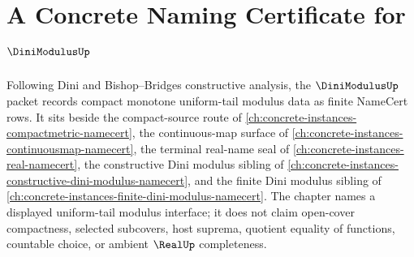 \chapter{A Concrete Naming Certificate for $\DiniModulusUp$}
\label{ch:concrete-instances-dini-modulus-namecert}

Following Dini and Bishop--Bridges constructive analysis, the $\DiniModulusUp$ packet records compact monotone uniform-tail modulus data as finite NameCert rows. It sits beside the compact-source route of \autoref{ch:concrete-instances-compactmetric-namecert}, the continuous-map surface of \autoref{ch:concrete-instances-continuousmap-namecert}, the terminal real-name seal of \autoref{ch:concrete-instances-real-namecert}, the constructive Dini modulus sibling of \autoref{ch:concrete-instances-constructive-dini-modulus-namecert}, and the finite Dini modulus sibling of \autoref{ch:concrete-instances-finite-dini-modulus-namecert}. The chapter names a displayed uniform-tail modulus interface; it does not claim open-cover compactness, selected subcovers, host suprema, quotient equality of functions, countable choice, or ambient $\RealUp$ completeness.

